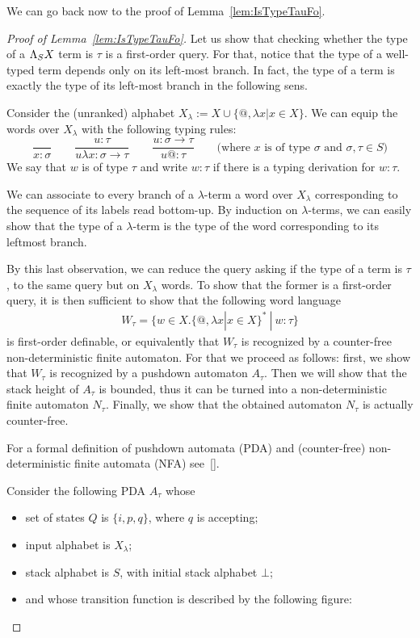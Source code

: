We can go back now to the proof of Lemma~\ref{lem:IsTypeTauFo}.
\begin{proof}[Proof of Lemma~\ref{lem:IsTypeTauFo}]
Let us show that checking whether the type of a $\Lambda_{S} X$ term is $\tau$ is a first-order query. For that, notice that the type of a well-typed term depends only on its left-most branch. In fact, the type of a term is exactly the type of its left-most branch in the following sens.

Consider the (unranked) alphabet $ X_\lambda:= X\cup \{\text{@}, \lambda x | x\in X\}$. We can equip the words over $X_\lambda$ with the following typing rules:
$$\frac{}{x: \sigma} \qquad \frac{u:\tau}{u\lambda x: \sigma\rightarrow \tau} \qquad \frac{u:\sigma\rightarrow\tau}{u\text{@}:\tau}\qquad\text{(where $x$ is of type $\sigma$ and $\sigma,\tau \in S$)}$$
We say that $w$ is of type $\tau$ and write $w:\tau$ if there is a typing derivation for $w:\tau$.

We can associate to every branch of a $\lambda$-term a word over $X_\lambda$ corresponding to the sequence of its labels read bottom-up. By induction on $\lambda$-terms, we can easily show that the type of a $\lambda$-term is the type of the word corresponding to its leftmost branch. 

By this last observation, we can reduce the query asking if the type of a term is $\tau$, to the same query but on $X_\lambda$ words. To show that the former is a first-order query, it is then sufficient to show that the following word language 
\begin{align*}
W_\tau = \{w\in X.\{\text{@}, \lambda x | x\in X\}^*\ |\ w:\tau \} 
\end{align*}
is first-order definable, or equivalently that  $W_\tau$ is recognized by a counter-free non-deterministic finite automaton. For that we proceed as follows: first, we show that $W_\tau$ is recognized by a pushdown automaton $A_\tau$. Then we will show that the stack height of $A_\tau$ is bounded, thus it can be turned into a non-deterministic finite automaton $N_\tau$. Finally, we show that the obtained automaton $N_\tau$ is actually counter-free.  

For a formal definition of pushdown automata (PDA) and (counter-free) non-deterministic finite automata (NFA) see~\ref{}.

Consider the following PDA $A_\tau$ whose
\begin{itemize}
\item set of states $Q$ is $\{i, p, q\}$, where $q$ is accepting;
\item input alphabet is $X_\lambda$;
\item stack alphabet is $S$, with initial stack alphabet $\bot$;
\item and whose transition function is described by the following figure:
\begin{center}


\end{center}
\end{itemize}
\end{proof}
